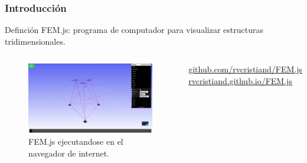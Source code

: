 \documentclass{beamer}
\begin{document}
\begin{frame}
  \frametitle{Introducción}
  \begin{block}{Definción}
    FEM.js: programa de computador para visualizar estructuras tridimensionales.
  \end{block}
  \begin{columns}
    \begin{figure}
      \includegraphics[width=1\textwidth]{FEM.js.png}
      \caption{FEM.js ejecutandose en el navegador de internet.}
    \end{figure}
    \href{https://github.com/rvcristiand/FEM.js}{github.com/rvcristiand/FEM.js} \\
    
    \href{https://rvcristiand.github.io/FEM.js}{rvcristiand.github.io/FEM.js}
  \end{columns}
\end{frame}
\end{document}
